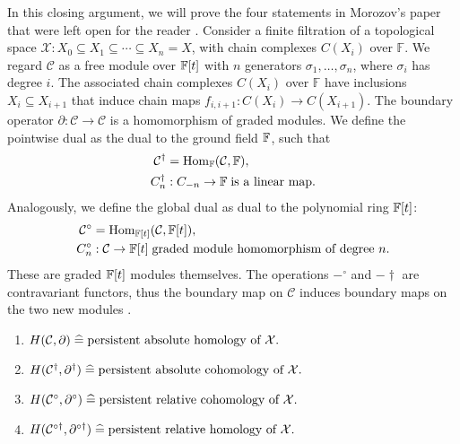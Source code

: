In this closing argument, we will prove the four statements in Morozov's paper that were left open for the reader \cite[\S 2.8]{de2011dualities}. Consider a finite filtration of a topological space $ \mathcal{X} : X_0 \subseteq X_1 \subseteq \cdots \subseteq X_n = X$, with chain complexes \( C(X_i) \) over \( \mathbb{F} \). We regard $\mathcal{C}$ as a free module over ${\mathbb{F}}[t]$ with $n$ generators $\sigma_1, \ldots, \sigma_n$, where $\sigma_i$ has degree $i$. The associated chain complexes \( C(X_i) \) over \( \mathbb{F} \) have inclusions \( X_i \subseteq X_{i+1} \) that induce chain maps \( f_{i,i+1}: C(X_i) \to C(X_{i+1}) \). The boundary operator $\partial: \mathcal{C} \rightarrow \mathcal{C}$ is a homomorphism of graded modules. We define the pointwise dual as the dual to the ground field ${\mathbb{F}}$, such that
\begin{align}
\mathcal{C}^\dagger &= {\mathrm{Hom}}_{\mathbb{F}}(\mathcal{C},{\mathbb{F}}), \\
C^\dagger_n&: C_{-n} \rightarrow {\mathbb{F}} \; \text{is a linear map.}
\end{align}
Analogously, we define the global dual as dual to the polynomial ring ${\mathbb{F}}[t]$:
\begin{align}
\mathcal{C}^\circ &= {\mathrm{Hom}}_{{\mathbb{F}}[t]}(\mathcal{C},{\mathbb{F}}[t]), \\
C^\circ_n&: \mathcal{C} \rightarrow {\mathbb{F}}[t] \; \text{graded module homomorphism of degree $n$.}
\end{align}
These are graded ${\mathbb{F}}[t]$ modules themselves. The operations $-^\circ$ and $-\dagger$ are contravariant functors, thus the boundary map on $\mathcal{C}$ induces boundary maps on the two new modules \cite[\S 2.8]{de2011dualities}.

\begin{corollary}\noindent
\begin{enumerate}
\item \(H(\mathcal{C}, \partial) \; \widehat{=} \; \text{persistent absolute homology\index{homology} of } \mathcal{X}.\)
\item \(H(\mathcal{C}^\dagger, \partial^\dagger) \; \widehat{=} \; \text{persistent absolute cohomology\index{cohomology} of } \mathcal{X}.\)
\item \(H(\mathcal{C}^\circ, \partial^\circ) \; \widehat{=} \; \text{persistent relative cohomology\index{cohomology} of } \mathcal{X}.\)
\item \(H(\mathcal{C}^{\circ\dagger}, \partial^{\circ\dagger}) \; \widehat{=} \; \text{persistent relative homology\index{homology} of } \mathcal{X}.\)
\end{enumerate}
\end{corollary}

